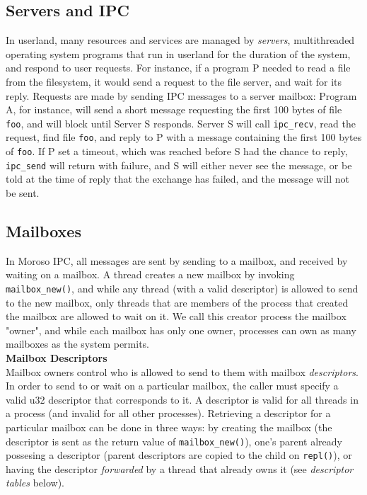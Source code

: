 \documentclass{article}
\begin{document}
\subsection{Servers and IPC}
In userland, many resources and services are managed by \emph{servers}, multithreaded operating system programs that run in userland for the duration of the system, and respond to user requests.  For instance, if a program P needed to read a file from the filesystem, it would send a request to the file server, and wait for its reply.  Requests are made by sending IPC messages to a server mailbox: Program A, for instance, will send a short message requesting the first 100 bytes of file \verb|foo|, and will block until Server S responds.  Server S will call \verb|ipc_recv|, read the request, find file \verb|foo|, and reply to P with a message containing the first 100 bytes of \verb|foo|.  If P set a timeout, which was reached before S had the chance to reply, \verb|ipc_send| will return with failure, and S will either never see the message, or be told at the time of reply that the exchange has failed, and the message will not be sent.

\subsection{Mailboxes}
In Moroso IPC, all messages are sent by sending to a mailbox, and received by waiting on a mailbox.  A thread creates a new mailbox by invoking \verb|mailbox_new()|, and while any thread (with a valid descriptor) is allowed to send to the new mailbox, only threads that are members of the process that created the mailbox are allowed to wait on it. We call this creator process the mailbox "owner", and while each mailbox has only one owner, processes can own as many mailboxes as the system permits.\\

\textbf{Mailbox Descriptors}\\
Mailbox owners control who is allowed to send to them with mailbox \emph{descriptors}.  In order to send to or wait on a particular mailbox, the caller must specify a valid u32 descriptor that corresponds to it.  A descriptor is valid for all threads in a process (and invalid for all other processes).  Retrieving a descriptor for a particular mailbox can be done in three ways: by creating the mailbox (the descriptor is sent as the return value of \verb|mailbox_new()|), one's parent already possesing a descriptor (parent descriptors are copied to the child on \verb|repl()|), or having the descriptor \emph{forwarded} by a thread that already owns it (see \emph{descriptor tables} below).  \\
\end{document}
